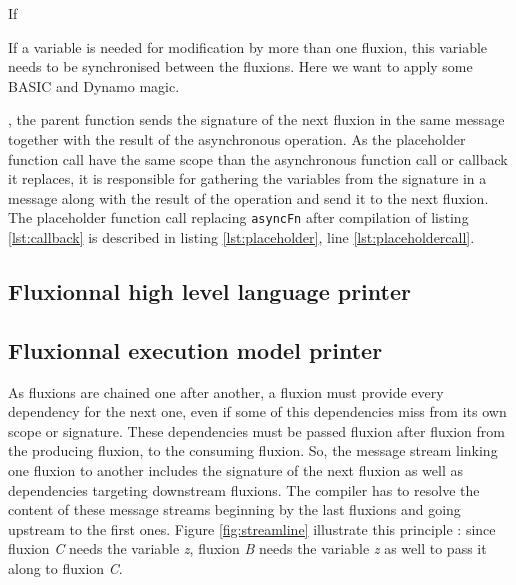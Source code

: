   If 

  If a variable is needed for modification by more than one fluxion, this variable needs to be synchronised between the fluxions.
  Here we want to apply some BASIC and Dynamo magic.



, the parent function sends the signature of the next fluxion in the same message together with the result of the asynchronous operation.
As the placeholder function call have the same scope than the asynchronous function call or callback it replaces, it is responsible for gathering the variables from the signature in a message along with the result of the operation and send it to the next fluxion.
The placeholder function call replacing \texttt{asyncFn} after compilation of listing \ref{lst:callback} is described in listing \ref{lst:placeholder}, line \ref{lst:placeholdercall}.









\subsection{Fluxionnal high level language printer}






\subsection{Fluxionnal execution model printer}



















As fluxions are chained one after another, a fluxion must provide every dependency for the next one, even if some of this dependencies miss from its own scope or signature.
These dependencies must be passed fluxion after fluxion from the producing fluxion, to the consuming fluxion.
So, the message stream linking one fluxion to another includes the signature of the next fluxion as well as dependencies targeting downstream fluxions.
The compiler has to resolve the content of these message streams beginning by the last fluxions and going upstream to the first ones.
Figure \ref{fig:streamline} illustrate this principle : since fluxion \textit{C} needs the variable \textit{z}, fluxion \textit{B} needs the variable \textit{z} as well to pass it along to fluxion \textit{C}.

